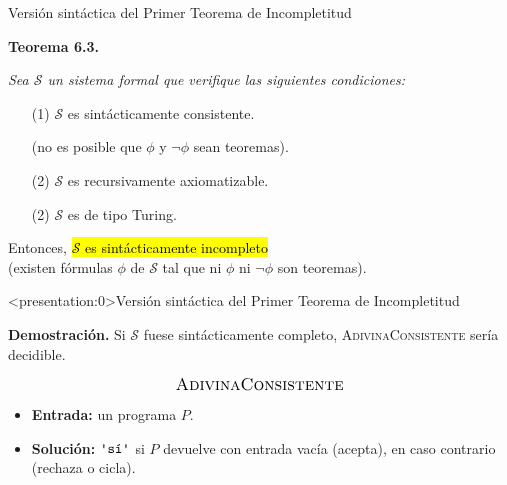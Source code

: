 \documentclass[10pt,xcolor=dvipsnames,aspectratio=169,spanish]{beamer}
\makeatletter
\let\HL\hl
\renewcommand\hl{%
  \let\set@color\beamerorig@set@color
  \let\reset@color\beamerorig@reset@color
  \HL}
\newcommand{\palabra}[1]{\texttt{\textquotesingle{}{#1}\textquotesingle{}}}
\makeatother
\begin{document}
\begin{frame}{Versión sintáctica del Primer Teorema de Incompletitud}

\textbf{Teorema 6.3.} {\itshape
Sea $\mathcal{S}$ un sistema formal que verifique las siguientes condiciones:
\begin{itemize}
    \item[(1)] $\mathcal{S}$ es sintácticamente consistente.

    (no es posible que $\phi$ y $\neg\phi$ sean teoremas).
    \item[(2)] $\mathcal{S}$ es recursivamente axiomatizable.
    \item[(2)] $\mathcal{S}$ es de tipo Turing.
\end{itemize}
Entonces, \hl{$\mathcal{S}$ es sintácticamente incompleto} \\
(existen fórmulas $\phi$ de $\mathcal{S}$ tal que ni $\phi$ ni $\neg\phi$ son teoremas).
}

\end{frame}


\begin{frame}<presentation:0>{Versión sintáctica del Primer Teorema de Incompletitud}

\textbf{Demostración.} Si $\mathcal{S}$ fuese sintácticamente completo, \textsc{AdivinaConsistente} sería decidible.

\vspace{5mm}

\begin{framed}
$$\text{\large \textsc{AdivinaConsistente}}$$

\begin{itemize}
    \item \textbf{Entrada:} un programa $P$.
    \item \textbf{Solución:} $\palabra{sí}$ si $P$ devuelve \palabra{sí} con entrada vacía (acepta), \palabra{no} en caso contrario (rechaza o cicla).
\end{itemize}
\end{framed}

\end{frame}
\end{document}
